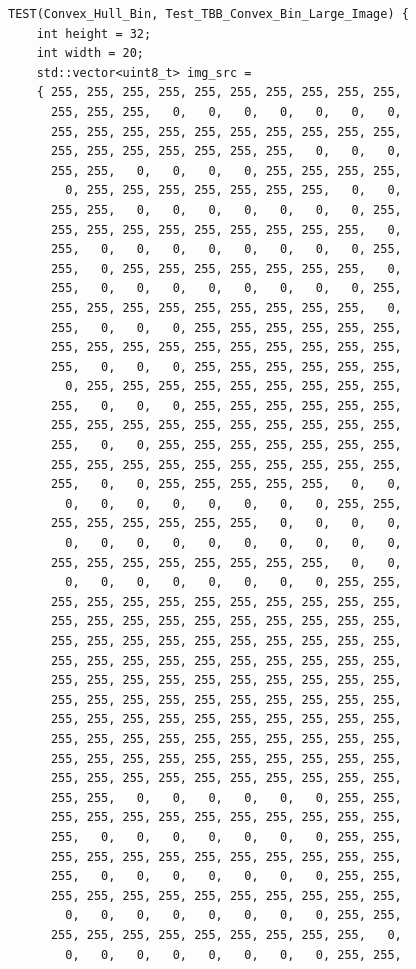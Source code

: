 \documentclass{report}
\begin{document}
\begin{lstlisting}
TEST(Convex_Hull_Bin, Test_TBB_Convex_Bin_Large_Image) {
    int height = 32;
    int width = 20;
    std::vector<uint8_t> img_src =
    { 255, 255, 255, 255, 255, 255, 255, 255, 255, 255,
      255, 255, 255,   0,   0,   0,   0,   0,   0,   0,
      255, 255, 255, 255, 255, 255, 255, 255, 255, 255,
      255, 255, 255, 255, 255, 255, 255,   0,   0,   0,
      255, 255,   0,   0,   0,   0, 255, 255, 255, 255,
        0, 255, 255, 255, 255, 255, 255, 255,   0,   0,
      255, 255,   0,   0,   0,   0,   0,   0,   0, 255,
      255, 255, 255, 255, 255, 255, 255, 255, 255,   0,
      255,   0,   0,   0,   0,   0,   0,   0,   0, 255,
      255,   0, 255, 255, 255, 255, 255, 255, 255,   0,
      255,   0,   0,   0,   0,   0,   0,   0,   0, 255,
      255, 255, 255, 255, 255, 255, 255, 255, 255,   0,
      255,   0,   0,   0, 255, 255, 255, 255, 255, 255,
      255, 255, 255, 255, 255, 255, 255, 255, 255, 255,
      255,   0,   0,   0, 255, 255, 255, 255, 255, 255,
        0, 255, 255, 255, 255, 255, 255, 255, 255, 255,
      255,   0,   0,   0, 255, 255, 255, 255, 255, 255,
      255, 255, 255, 255, 255, 255, 255, 255, 255, 255,
      255,   0,   0, 255, 255, 255, 255, 255, 255, 255,
      255, 255, 255, 255, 255, 255, 255, 255, 255, 255,
      255,   0,   0, 255, 255, 255, 255, 255,   0,   0,
        0,   0,   0,   0,   0,   0,   0,   0, 255, 255,
      255, 255, 255, 255, 255, 255,   0,   0,   0,   0,
        0,   0,   0,   0,   0,   0,   0,   0,   0,   0,
      255, 255, 255, 255, 255, 255, 255, 255,   0,   0,
        0,   0,   0,   0,   0,   0,   0,   0, 255, 255,
      255, 255, 255, 255, 255, 255, 255, 255, 255, 255,
      255, 255, 255, 255, 255, 255, 255, 255, 255, 255,
      255, 255, 255, 255, 255, 255, 255, 255, 255, 255,
      255, 255, 255, 255, 255, 255, 255, 255, 255, 255,
      255, 255, 255, 255, 255, 255, 255, 255, 255, 255,
      255, 255, 255, 255, 255, 255, 255, 255, 255, 255,
      255, 255, 255, 255, 255, 255, 255, 255, 255, 255,
      255, 255, 255, 255, 255, 255, 255, 255, 255, 255,
      255, 255, 255, 255, 255, 255, 255, 255, 255, 255,
      255, 255, 255, 255, 255, 255, 255, 255, 255, 255,
      255, 255,   0,   0,   0,   0,   0,   0, 255, 255,
      255, 255, 255, 255, 255, 255, 255, 255, 255, 255,
      255,   0,   0,   0,   0,   0,   0,   0, 255, 255,
      255, 255, 255, 255, 255, 255, 255, 255, 255, 255,
      255,   0,   0,   0,   0,   0,   0,   0, 255, 255,
      255, 255, 255, 255, 255, 255, 255, 255, 255, 255,
        0,   0,   0,   0,   0,   0,   0,   0, 255, 255,
      255, 255, 255, 255, 255, 255, 255, 255, 255,   0,
        0,   0,   0,   0,   0,   0,   0,   0, 255, 255,

\end{lstlisting}
\end{document}
